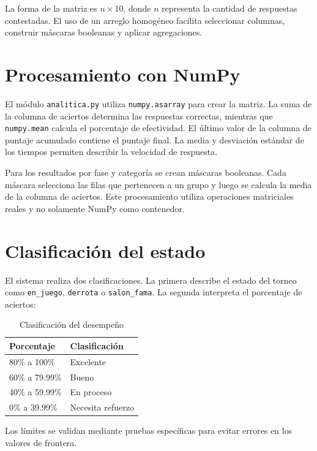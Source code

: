 \documentclass[stu,12pt,a4paper,biblatex,floatsintext]{apa7}
\begin{document}
La forma de la matriz es $n \times 10$, donde $n$ representa la cantidad de respuestas contestadas. El uso de un arreglo homogéneo facilita seleccionar columnas, construir máscaras booleanas y aplicar agregaciones.

\section{Procesamiento con NumPy}

El módulo \texttt{analitica.py} utiliza \texttt{numpy.asarray} para crear la matriz. La suma de la columna de aciertos determina las respuestas correctas, mientras que \texttt{numpy.mean} calcula el porcentaje de efectividad. El último valor de la columna de puntaje acumulado contiene el puntaje final. La media y desviación estándar de los tiempos permiten describir la velocidad de respuesta.

Para los resultados por fase y categoría se crean máscaras booleanas. Cada máscara selecciona las filas que pertenecen a un grupo y luego se calcula la media de la columna de aciertos. Este procesamiento utiliza operaciones matriciales reales y no solamente NumPy como contenedor.

\section{Clasificación del estado}

El sistema realiza dos clasificaciones. La primera describe el estado del torneo como \texttt{en\_juego}, \texttt{derrota} o \texttt{salon\_fama}. La segunda interpreta el porcentaje de aciertos:

\begin{table}[htbp]
  \centering
  \caption{Clasificación del desempeño}
  \begin{tabular}{ll}
    \toprule
    \rowcolor{utpAzulClaro}
    \textcolor{utpAzul}{\textbf{Porcentaje}} & \textcolor{utpAzul}{\textbf{Clasificación}} \\
    \midrule
    80\% a 100\% & Excelente \\
    60\% a 79.99\% & Bueno \\
    40\% a 59.99\% & En proceso \\
    0\% a 39.99\% & Necesita refuerzo \\
    \bottomrule
  \end{tabular}
\end{table}

Los límites se validan mediante pruebas específicas para evitar errores en los valores de frontera.
\end{document}
